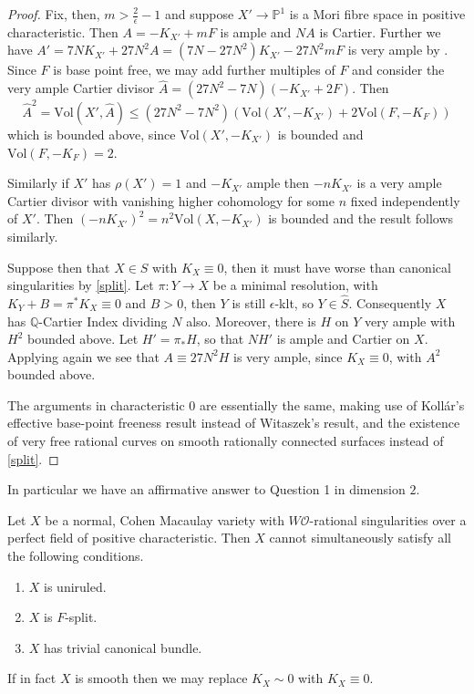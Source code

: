\documentclass[a4paper,12pt]{book}
\newcommand{\Vol}{\text{Vol}}
\begin{document}
\begin{proof}
	Fix, then, $m > \frac{2}{\epsilon}-1$ and suppose $X'\to \mathbb{P}^{1}$ is a Mori fibre space in positive characteristic. Then $A=-K_{X'} +mF$ is ample and $NA$ is Cartier. Further we have $A'=7NK_{X'}+27N^{2}A=(7N-27N^{2})K_{X'}-27N^{2}mF$ is very ample by \cite[Theorem 4.1]{witaszek2015effective}. Since $F$ is base point free, we may add further multiples of $F$ and consider the very ample Cartier divisor $\hat{A}=(27N^{2}-7N)(-K_{X'}+2F)$. Then $$\hat{A}^{2}=\Vol(X',\hat{A})\leq (27N^{2}-7N^{2})(\Vol(X',-K_{X'})+2\Vol(F,-K_{F}))$$ which is bounded above, since $\Vol(X',-K_{X'})$ is bounded and $\Vol(F,-K_{F})=2$. 
	
	Similarly if $X'$ has $\rho(X')=1$ and $-K_{X'}$ ample then $-nK_{X'}$ is a very ample Cartier divisor with vanishing higher cohomology for some $n$ fixed independently of $X'$. Then $(-nK_{X'})^{2}=n^{2}\Vol(X,-K_{X'})$ is bounded and the result follows similarly.
	
	Suppose then that $X \in S$ with $K_{X} \equiv 0$, then it must have worse than canonical singularities by \autoref{split}. Let $\pi\colon Y \to X$ be a minimal resolution, with $K_{Y}+B=\pi^{*}K_{X} \equiv 0$ and $B >0$, then $Y$ is still $\epsilon$-klt, so $Y \in \hat{S}$. Consequently $X$ has $\mathbb{Q}$-Cartier Index dividing $N$ also. Moreover, there is $H$ on $Y$ very ample with $H^{2}$ bounded above. Let $H'=\pi_{*}H$, so that $NH'$ is ample and Cartier on $X$. Applying \cite[Theorem 4.1]{witaszek2015effective} again we see that $A\equiv 27N^{2}H$ is very ample, since $K_{X}\equiv 0$, with $A^{2}$ bounded above.
	
	The arguments in characteristic $0$ are essentially the same, making use of Koll{\'a}r's effective base-point freeness result \cite[Theorem 1.1, Lemma 1.2]{kollar1993effective} instead of Witaszek's result, and the existence of very free rational curves on smooth rationally connected surfaces instead of \autoref{split}.
\end{proof}

\begin{remark}
	In particular we have an affirmative answer to Question 1 in dimension $2$.
\end{remark}

\begin{theorem}\cite[Theorem 1.2]{patakfalvi2019ordinary}\label{split}
	Let $X$ be a normal, Cohen Macaulay variety with $W\mathcal{O}$-rational singularities over a perfect field of positive characteristic. Then $X$ cannot simultaneously satisfy all the following conditions.
	\begin{enumerate}
		\item $X$ is uniruled.
		\item $X$ is $F$-split.
		\item $X$ has trivial canonical bundle.
	\end{enumerate}
	If in fact $X$ is smooth then we may replace $K_{X}\sim 0$ with $K_{X} \equiv 0$.
\end{theorem}
\end{document}
